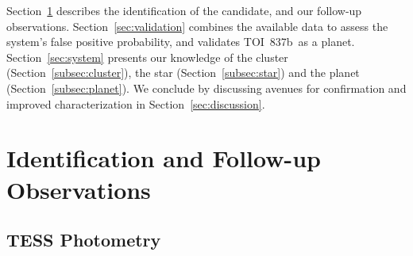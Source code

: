 \documentclass[12pt,twocolumn,tighten]{aastex63}
\newcommand{\pn}{TOI~837b} %
\begin{document}
Section~\ref{sec:observations} describes the identification of the
candidate, and our follow-up observations.
Section~\ref{sec:validation} combines the available data to assess the
system's false positive probability, and validates \pn\ as a planet.
Section~\ref{sec:system} presents our knowledge of the cluster
(Section~\ref{subsec:cluster}), the star (Section~\ref{subsec:star})
and the planet (Section~\ref{subsec:planet}).  We conclude by
discussing avenues for confirmation and improved characterization in
Section~\ref{sec:discussion}.



\section{Identification and Follow-up Observations}
\label{sec:observations}


\subsection{TESS Photometry}
\label{subsec:tess}
\end{document}
